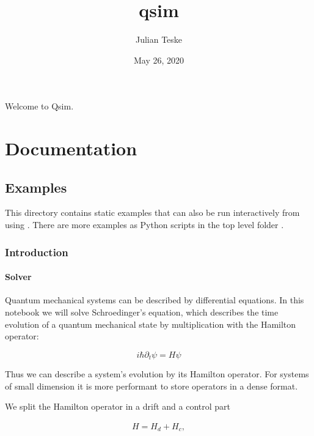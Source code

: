 \documentclass[letterpaper,10pt,english]{sphinxmanual}
\title{qsim}
\date{May 26, 2020}
\author{Julian Teske}
\begin{document}
\pagestyle{empty}
\sphinxmaketitle
\pagestyle{plain}
\sphinxtableofcontents
\pagestyle{normal}
\label{\detokenize{index::doc}}


Welcome to Qsim.


\chapter{Documentation}
\label{\detokenize{index:documentation}}

\section{Examples}
\label{\detokenize{examples/examples:examples}}\label{\detokenize{examples/examples:id1}}\label{\detokenize{examples/examples::doc}}
This directory contains static examples that can also be run interactively
from  using .
There are more examples as Python scripts in the top level folder .


\subsection{Introduction}
\label{\detokenize{examples/schroedinger_solver:Introduction}}\label{\detokenize{examples/schroedinger_solver::doc}}

\subsubsection{Solver}
\label{\detokenize{examples/schroedinger_solver:Solver}}
Quantum mechanical systems can be described by differential equations. In this notebook we will solve Schroedinger’s equation, which describes the time evolution of a quantum mechanical state by multiplication with the Hamilton operator:

\begin{equation}
i \hbar \partial_t \psi = H \psi
\end{equation}

Thus we can describe a system’s evolution by its Hamilton operator. For systems of small dimension it is more performant to store operators in a dense format.

We split the Hamilton operator in a drift and a control part

\begin{align*}
H = H_d + H_c,
\end{align*}
\end{document}
